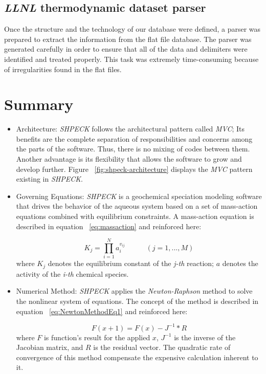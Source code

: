 \subsection{\emph{LLNL} thermodynamic dataset parser}
Once the structure and the technology of our database were defined, a parser was prepared to extract the information from the flat file database. 
The parser was generated carefully in order to ensure that all of the data and delimiters were identified and treated properly. This task was extremely time-consuming because of irregularities found in the flat files.

\newpage

\section{Summary}
\begin{itemize}
\item Architecture: \emph{SHPECK} follows the architectural pattern called \emph{MVC}; Its benefits are the complete separation of responsibilities and concerns among the parts of the software. Thus, there is no mixing of codes between them. Another advantage is its flexibility that allows the software to grow and develop further. Figure ~\ref{fig:shpeck-architecture} displays the \emph{MVC} pattern existing in \emph{SHPECK}.
\item Governing Equations: \emph{SHPECK} is a geochemical speciation modeling software that drives the behavior of the aqueous system based on a set of mass-action equations combined with equilibrium constraints. A mass-action equation is described in equation  ~\ref{eq:massaction} and reinforced here:

\begin{equation}
K_j =  \prod\limits_{i=1}^N  a_i^{v_{ij}} \hspace{35pt}    (j = 1, ... , M)
\end{equation}
where $K_j$ denotes the equilibrium constant of the \emph{j-th} reaction; $a$ denotes the activity of the \emph{i-th} chemical species.

\item Numerical Method: \emph{SHPECK} applies the \emph{Newton-Raphson} method to solve the nonlinear system of equations. The concept of the method is described in equation ~\ref{eq:NewtonMethodEq1} and reinforced here:

\begin{equation}
F(x+1) = F(x) - J^{-1} * R
\end{equation}
where $F$ is function's result for the applied $x$, $J^{-1}$ is the inverse of the Jacobian matrix, and $R$ is the residual vector. The quadratic rate of convergence of this method compensate the expensive calculation inherent to it.


\end{itemize}
